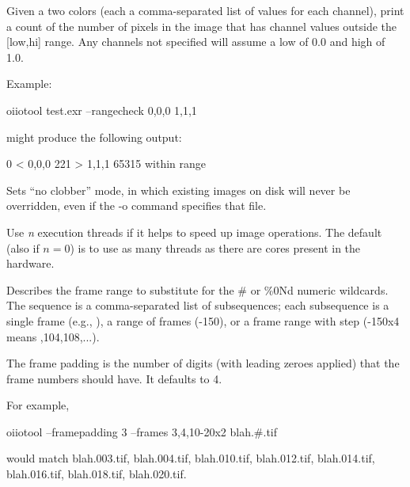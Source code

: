 Given a two colors (each a comma-separated list of values for each
channel), print a count of the number of pixels in the image that has
channel values outside the [low,hi] range.  Any channels not
specified will assume a low of 0.0 and high of 1.0.

\noindent Example:

\begin{code}
    oiiotool test.exr --rangecheck 0,0,0 1,1,1
\end{code}
\noindent might produce the following output:
\begin{code}
     0  < 0,0,0
   221  > 1,1,1
 65315  within range
\end{code}
\apiend

Sets ``no clobber'' mode, in which existing images on disk will never be 
overridden, even if the {\cf -o} command specifies that file.
\apiend

Use \emph{n} execution threads if it helps to speed up image operations.
The default (also if $n=0$) is to use as many threads as there are cores
present in the hardware.
\apiend

Describes the frame range to substitute for the {\cf \#} or {\cf \%0Nd} 
numeric wildcards.  The
sequence is a comma-separated list of subsequences; each subsequence
is a single frame (e.g., {}), a range of frames ({-150}),
or a frame range with step ({-150x4} means {,104,108,...}).

The frame padding is the number of digits (with leading zeroes applied)
that the frame numbers should have.  It defaults to 4.

For example,
\begin{code}
    oiiotool --framepadding 3 --frames 3,4,10-20x2 blah.#.tif
\end{code}
\noindent would match {\cf blah.003.tif}, {\cf blah.004.tif},
{\cf blah.010.tif}, {\cf blah.012.tif}, 
{\cf blah.014.tif}, {\cf blah.016.tif}, {\cf blah.018.tif}, 
{\cf blah.020.tif}.
\apiend

